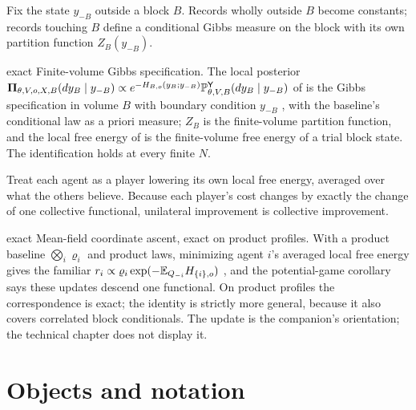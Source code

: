 Fix the state $y_{-B}$ outside a block $B$. Records wholly outside $B$ become constants; records
touching $B$ define a conditional Gibbs measure on the block with its own partition function
$Z_B(y_{-B})$.

\begin{analogy}{exact}
Finite-volume Gibbs specification. The local posterior
$\boldsymbol\Pi_{\theta,V,o,X,B}(dy_B\mid y_{-B})\propto e^{-H_{B,o}(y_B;y_{-B})}\mathbb P^{\mathsf Y}_{\theta,V,B}(dy_B\mid y_{-B})$
of  is the Gibbs specification in volume $B$ with boundary condition
$y_{-B}$ \citep{Georgii1988}, with the baseline's conditional law as a priori measure; $Z_B$ is the
finite-volume partition function, and the local free energy of  is the
finite-volume free energy of a trial block state. The identification holds at every finite $N$.
\end{analogy}

Treat each agent as a player lowering its own local free energy, averaged over what the others
believe. Because each player's cost changes by exactly the change of one collective functional,
unilateral improvement is collective improvement.

\begin{analogy}{exact}
Mean-field coordinate ascent, exact on product profiles. With a product baseline
$\bigotimes_i\varrho_i$ and product laws, minimizing agent $i$'s averaged local free energy gives the
familiar $r_i\propto\varrho_i\exp(-\mathbb E_{Q_{-i}}H_{\{i\},o})$ \citep{Blei2017}, and the potential-game
corollary says these updates descend one functional. On product profiles the correspondence is exact;
the identity is strictly more general, because it also covers correlated block conditionals. The
update is the companion's orientation; the technical chapter does not display it.
\end{analogy}

\section{Objects and notation}
\label{comp:ch05-objects}

